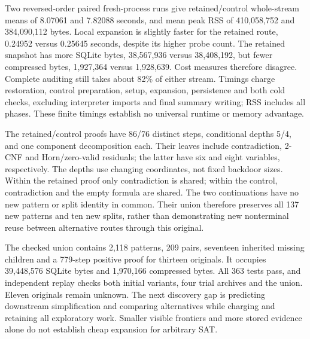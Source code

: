 \documentclass[11pt,a4paper]{article}
\numberwithin{equation}{section}
\theoremstyle{plain}
\theoremstyle{definition}
\theoremstyle{remark}
\begin{document}
Two reversed-order paired fresh-process runs give retained/control whole-stream
means of 8.07061 and 7.82088 seconds, and mean peak RSS of 410,058,752 and
384,090,112 bytes. Local expansion is slightly faster for the retained route,
0.24952 versus 0.25645 seconds, despite its higher probe count. The retained
snapshot has more SQLite bytes, 38,567,936 versus 38,408,192, but fewer compressed
bytes, 1,927,364 versus 1,928,639. Cost measures therefore disagree. Complete
auditing still takes about 82\% of either stream. Timings charge restoration,
control preparation, setup, expansion, persistence and both cold checks, excluding
interpreter imports and final summary writing; RSS includes all phases. These
finite timings establish no universal runtime or memory advantage.

The retained/control proofs have 86/76 distinct steps, conditional depths 5/4,
and one component decomposition each. Their leaves include contradiction,
2-CNF and Horn/zero-valid residuals; the latter have six and eight variables,
respectively. The depths use changing coordinates, not fixed backdoor sizes.
Within the retained proof only contradiction is shared; within the control,
contradiction and the empty formula are shared. The two continuations have no
new pattern or split identity in common. Their union therefore preserves all
137 new patterns and ten new splits, rather than demonstrating new nonterminal
reuse between alternative routes through this original.

The checked union contains 2,118 patterns, 209 pairs, seventeen inherited missing
children and a 779-step positive proof for thirteen originals. It occupies
39,448,576 SQLite bytes and 1,970,166 compressed bytes. All 363 tests pass, and
independent replay checks both initial variants, four trial archives and the
union. Eleven originals remain unknown. The next discovery gap is predicting
downstream simplification and comparing alternatives while charging and retaining
all exploratory work. Smaller visible frontiers and more stored evidence alone
do not establish cheap expansion for arbitrary SAT.
\end{document}
